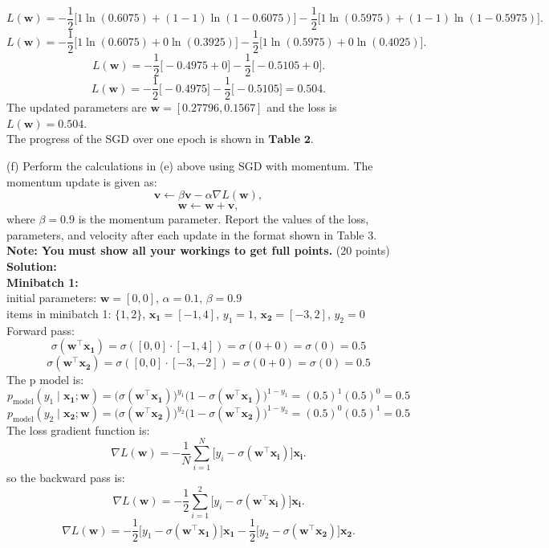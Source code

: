 \documentclass[a3paper,12pt]{article} %
\begin{document}
\[
L(\mathbf{w}) = -\frac{1}{2} \big[1 \ln(0.6075) + (1-1) \ln(1-0.6075)\big] - \frac{1}{2} \big[1 \ln(0.5975) + (1-1) \ln(1-0.5975)\big].
\]
\[
L(\mathbf{w}) = -\frac{1}{2} \big[1 \ln(0.6075) + 0 \ln(0.3925)\big] - \frac{1}{2} \big[1 \ln(0.5975) + 0 \ln(0.4025)\big].
\]
\[
L(\mathbf{w}) = -\frac{1}{2} \big[-0.4975 + 0\big] - \frac{1}{2} \big[-0.5105 + 0\big].
\]
\[
L(\mathbf{w}) = -\frac{1}{2} \big[-0.4975\big] - \frac{1}{2} \big[-0.5105\big] = 0.504.
\]
The updated parameters are \(\mathbf{w} = \mathbf{[0.27796, 0.1567]}\) and the loss is \(L(\mathbf{w}) = \mathbf{0.504}\).
\\ The progress of the SGD over one epoch is shown in \(\textbf{Table 2}\).

(f)
Perform the calculations in (e) above using SGD with momentum. The momentum update is given as:
\[
\mathbf{v} \gets \beta \mathbf{v} - \alpha \nabla L(\mathbf{w}),
\]
\[
\mathbf{w} \gets \mathbf{w} + \mathbf{v},
\]
where $\beta = 0.9$ is the momentum parameter. Report the values of the loss, parameters, and velocity after each update in the format shown in Table 3. \textbf{Note: You must show all your workings to get full points.}
\hfill (20 points)
\\ \textbf{Solution:}
\\ \textbf{Minibatch 1:}
\\ initial parameters: \(\mathbf{w} = [0, 0]\), \(\alpha = 0.1\), \(\beta = 0.9\)
\\ items in minibatch 1: \(\{1, 2\}\), \(\mathbf{x_1} = [-1, 4]\), \(y_1 = 1\), \(\mathbf{x_2} = [-3, 2]\), \(y_2 = 0\)
\\ Forward pass:
\[
\sigma(\mathbf{w}^\top \mathbf{x_1}) = \sigma([0, 0] \cdot [-1, 4]) = \sigma(0 + 0) = \sigma(0) = 0.5
\]
\[
\sigma(\mathbf{w}^\top \mathbf{x_2}) = \sigma([0, 0] \cdot [-3, -2]) = \sigma(0 + 0) = \sigma(0) = 0.5
\]
The p model is:
\[
p_{\text{model}}(y_1 \mid \mathbf{x_1}; \mathbf{w}) = \big(\sigma(\mathbf{w}^\top \mathbf{x_1})\big)^{y_1} \big(1 - \sigma(\mathbf{w}^\top \mathbf{x_1})\big)^{1-y_1} = (0.5)^1 (0.5)^0 = 0.5
\]
\[
p_{\text{model}}(y_2 \mid \mathbf{x_2}; \mathbf{w}) = \big(\sigma(\mathbf{w}^\top \mathbf{x_2})\big)^{y_2} \big(1 - \sigma(\mathbf{w}^\top \mathbf{x_2})\big)^{1-y_2} = (0.5)^0 (0.5)^1 = 0.5
\]
The loss gradient function is:
\[
\nabla L(\mathbf{w}) = -\frac{1}{N} \sum^N_{i=1} \big[y_i - \sigma(\mathbf{w}^\top \mathbf{x_i})\big] \mathbf{x_i}.
\]
so the backward pass is:
\[
\nabla L(\mathbf{w}) = -\frac{1}{2} \sum^2_{i=1} \big[y_i - \sigma(\mathbf{w}^\top \mathbf{x_i})\big] \mathbf{x_i}.
\]
\[
\nabla L(\mathbf{w}) = -\frac{1}{2} \big[y_1 - \sigma(\mathbf{w}^\top \mathbf{x_1})\big] \mathbf{x_1} - \frac{1}{2} \big[y_2 - \sigma(\mathbf{w}^\top \mathbf{x_2})\big] \mathbf{x_2}.
\]
\end{document}
